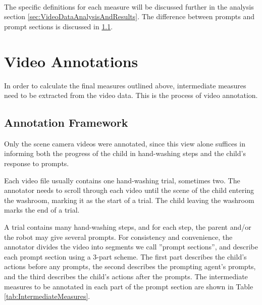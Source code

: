 \documentclass{ut-thesis}
\begin{document}
\paragraph{} %
The specific definitions for each measure will be discussed further in the analysis section \ref{sec:VideoDataAnalysisAndResults}.  The difference between prompts and prompt sections is discussed in \ref{sec:AnnotationFramework}.
\section{Video Annotations}
In order to calculate the final measures outlined above, intermediate measures need to be extracted from the video data.  This is the process of video annotation.



\subsection{Annotation Framework}
\label{sec:AnnotationFramework}
Only the scene camera videos were annotated, since this view alone suffices in informing both the progress of the child in hand-washing steps and the child's response to prompts.

Each video file usually contains one hand-washing trial, sometimes two.  The annotator needs to scroll through each video until the scene of the child entering the washroom, marking it as the start of a trial.  The child leaving the washroom marks the end of a trial.

A trial contains many hand-washing steps, and for each step, the parent and/or the robot may give several prompts.  For consistency and convenience, the annotator divides the video into segments we call ''prompt sections'', and describe each prompt section using a 3-part scheme.  The first part describes the child's actions before any prompts, the second describes the prompting agent's prompts, and the third describes the child's actions after the prompts.  The intermediate measures to be annotated in each part of the prompt section are shown in Table \ref{tab:IntermediateMeasures}.
\end{document}
